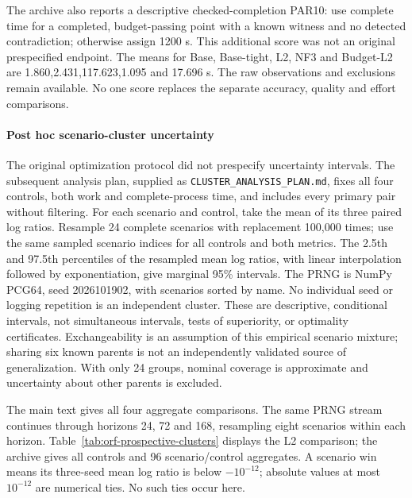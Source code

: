 The archive also reports a descriptive checked-completion PAR10: use complete
time for a completed, budget-passing point with a known witness and no detected
contradiction; otherwise assign 1200 s. This additional score was not an original
prespecified endpoint. The means for Base, Base-tight, L2, NF3 and Budget-L2
are 1.860,2.431,117.623,1.095 and 17.696 s. The raw observations and exclusions
remain available. No one score replaces the separate accuracy, quality and
effort comparisons.

\paragraph{Post hoc scenario-cluster uncertainty}
The original optimization protocol did not prespecify uncertainty intervals.
The subsequent analysis plan, supplied as \texttt{CLUSTER\_ANALYSIS\_PLAN.md},
fixes all four controls, both work and complete-process time, and includes every
primary pair without filtering. For each scenario and control, take the mean
of its three paired log ratios. Resample 24 complete scenarios with replacement
100,000 times; use the same sampled scenario indices for all controls and both
metrics. The 2.5th and 97.5th percentiles of the resampled mean log ratios,
with linear interpolation followed by exponentiation, give marginal 95\%
intervals. The PRNG is NumPy PCG64, seed 2026101902, with scenarios sorted by
name. No individual seed or logging repetition is an independent cluster.
These are descriptive, conditional intervals, not simultaneous intervals,
tests of superiority, or optimality certificates. Exchangeability is an
assumption of this empirical scenario mixture; sharing six known parents is
not an independently validated source of generalization. With only 24 groups,
nominal coverage is approximate and uncertainty about other parents is excluded.

The main text gives all four aggregate comparisons. The same PRNG stream
continues through horizons 24, 72 and 168, resampling eight scenarios within
each horizon. Table~\ref{tab:orf-prospective-clusters} displays the L2 comparison;
the archive gives all controls and 96 scenario/control aggregates. A scenario
win means its three-seed mean log ratio is below $-10^{-12}$; absolute values
at most $10^{-12}$ are numerical ties. No such ties occur here.

